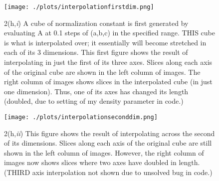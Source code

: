 \begin{figure}[h!]
  \centering
  \texttt{[image: ./plots/interpolationfirstdim.png]}
  \caption{2(h,\textit{i}) A cube of normalization constant is first generated by evaluating A at 0.1 steps of (a,b,c) in the specified range. THIS cube is what is interpolated over; it essentially will become stretched in each of its 3 dimensions. This first figure shows the result of interpolating in just the first of its three axes. Slices along each axis of the original cube are shown in the left column of images. The right column of images shows slices in the interpolated cube (in just one dimension). Thus, one of its axes has changed its length (doubled, due to setting of my density parameter in code.)}
  \label{fig:onedim}
\end{figure}

\begin{figure}[h!]
  \centering
  \texttt{[image: ./plots/interpolationseconddim.png]}
  \caption{2(h,\textit{ii}) This figure shows the result of interpolating across the second of its dimensions. Slices along each axis of the original cube are still shown in the left column of images. However, the right column of images now shows slices where two axes have doubled in length. (THIRD axis interpolation not shown due to unsolved bug in code.)}
  \label{fig:twodim}
\end{figure}
